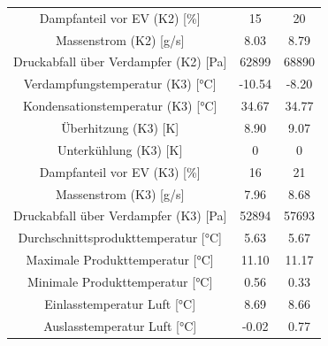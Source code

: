 \begin{table}[h!]
\begin{tabular}{|ccc|}
\multicolumn{1}{|c|}{Dampfanteil vor EV (K2) {[}\%{]}}          & \multicolumn{1}{c|}{15}     & 20                \\
\multicolumn{1}{|c|}{Massenstrom (K2) {[}g/s{]}}                & \multicolumn{1}{c|}{8.03}   & 8.79              \\
\multicolumn{1}{|c|}{Druckabfall über Verdampfer (K2) {[}Pa{]}} & \multicolumn{1}{c|}{62899}  & 68890             \\ \hline
\multicolumn{1}{|c|}{Verdampfungstemperatur (K3) {[}°C{]}}      & \multicolumn{1}{c|}{-10.54} & -8.20             \\
\multicolumn{1}{|c|}{Kondensationstemperatur (K3) {[}°C{]}}    & \multicolumn{1}{c|}{34.67}  & 34.77             \\
\multicolumn{1}{|c|}{Überhitzung (K3) {[}K{]}}                  & \multicolumn{1}{c|}{8.90}   & 9.07              \\
\multicolumn{1}{|c|}{Unterkühlung (K3) {[}K{]}}                 & \multicolumn{1}{c|}{0}      & 0                 \\
\multicolumn{1}{|c|}{Dampfanteil vor EV (K3) {[}\%{]}}          & \multicolumn{1}{c|}{16}     & 21                \\
\multicolumn{1}{|c|}{Massenstrom (K3) {[}g/s{]}}                & \multicolumn{1}{c|}{7.96}   & 8.68              \\
\multicolumn{1}{|c|}{Druckabfall über Verdampfer (K3) {[}Pa{]}} & \multicolumn{1}{c|}{52894}  & 57693             \\ \hline
\multicolumn{1}{|c|}{Durchschnittsprodukttemperatur {[}°C{]}}   & \multicolumn{1}{c|}{5.63}   & 5.67              \\
\multicolumn{1}{|c|}{Maximale Produkttemperatur {[}°C{]}}       & \multicolumn{1}{c|}{11.10}  & 11.17             \\
\multicolumn{1}{|c|}{Minimale Produkttemperatur {[}°C{]}}       & \multicolumn{1}{c|}{0.56}   & 0.33              \\
\multicolumn{1}{|c|}{Einlasstemperatur Luft {[}°C{]}}           & \multicolumn{1}{c|}{8.69}   & 8.66              \\
\multicolumn{1}{|c|}{Auslasstemperatur Luft {[}°C{]}}           & \multicolumn{1}{c|}{-0.02}  & 0.77              \\ \hline
\end{tabular}
\end{table}















